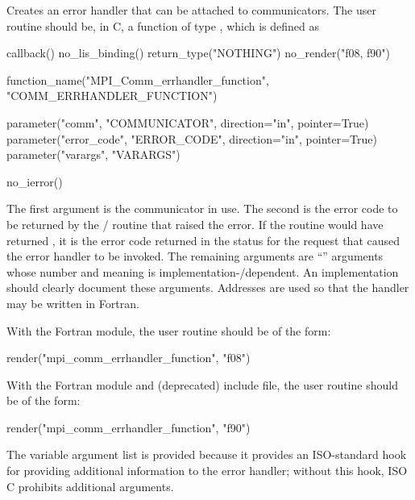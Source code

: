 Creates an error handler that can be attached to communicators.
The user routine should be, in C, a
function of type
, which is defined as

\begin{mpi-binding}
    callback()
    no_lis_binding()
    return_type("NOTHING")
    no_render("f08, f90")
    
    function_name("MPI_Comm_errhandler_function", "COMM_ERRHANDLER_FUNCTION")
    
    parameter("comm", "COMMUNICATOR", direction="in", pointer=True)
    parameter("error_code", "ERROR_CODE", direction="in", pointer=True)
    parameter("varargs", "VARARGS")
    
    no_ierror()
\end{mpi-binding}

The first argument is the communicator in use.
The second is
the error code to be returned by the \MPI/ routine that raised the error.
If the routine would have returned , it is
the error code returned in the status for the request that caused the
error handler to be invoked.
The remaining arguments are ``'' arguments
whose number and meaning is implementation\hyphen/dependent.  An implementation
should clearly document these arguments.
Addresses are used so that the handler may be written in Fortran.

\noindent
With the Fortran  module, the user routine  should be of the form:
 
\begin{mpi-binding}
    render("mpi_comm_errhandler_function", "f08")
\end{mpi-binding}

\noindent
With the Fortran  module and (deprecated)  include file,
the user routine  should be of the form:

\begin{mpi-binding}
    render("mpi_comm_errhandler_function", "f90")
\end{mpi-binding}

\begin{rationale}
The variable argument list is provided because it provides an
ISO-standard
hook for providing additional information to the error
handler; without this hook, 
ISO C 
prohibits additional arguments.
\end{rationale}

